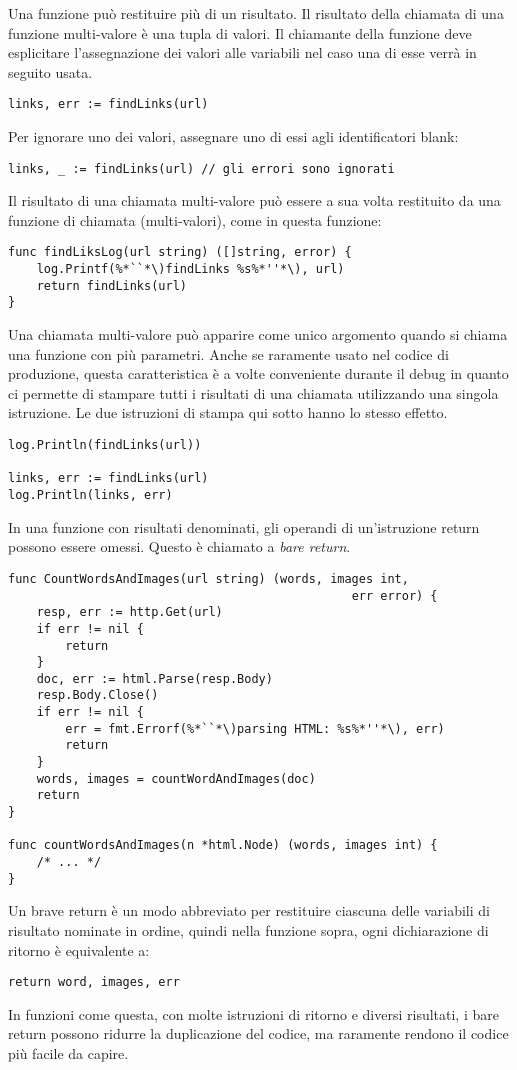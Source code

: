 Una funzione può restituire più di un risultato.
Il risultato della chiamata di una funzione multi-valore è una tupla di valori.
Il chiamante della funzione deve esplicitare l'assegnazione dei valori alle variabili nel caso una di esse verrà in seguito usata.
\begin{lstlisting}[frame=single, label={lst:lstlisting4-3.1}]
links, err := findLinks(url)
\end{lstlisting}
Per ignorare uno dei valori, assegnare uno di essi agli identificatori blank:
\begin{lstlisting}[frame=single, label={lst:lstlisting4-3.2}]
links, _ := findLinks(url) // gli errori sono ignorati
\end{lstlisting}
Il risultato di una chiamata multi-valore può essere a sua volta restituito da una funzione di chiamata (multi-valori), come in questa funzione:
\begin{lstlisting}[frame=single, label={lst:lstlisting4-3.3}]
func findLiksLog(url string) ([]string, error) {
    log.Printf(%*``*\)findLinks %s%*''*\), url)
    return findLinks(url)
}
\end{lstlisting}
Una chiamata multi-valore può apparire come unico argomento quando si chiama una funzione con più parametri.
Anche se raramente usato nel codice di produzione, questa caratteristica è a volte conveniente durante il debug in quanto ci permette di stampare tutti i risultati di una chiamata utilizzando una singola istruzione.
Le due istruzioni di stampa qui sotto hanno lo stesso effetto.
\begin{lstlisting}[frame=single, label={lst:lstlisting4-3.4}]
log.Println(findLinks(url))

links, err := findLinks(url)
log.Println(links, err)
\end{lstlisting}
In una funzione con risultati denominati, gli operandi di un'istruzione return possono essere omessi.
Questo è chiamato a \textit{bare return}.
\begin{lstlisting}[frame=single, label={lst:lstlisting4-3.5}]
func CountWordsAndImages(url string) (words, images int,
                                                err error) {
    resp, err := http.Get(url)
    if err != nil {
        return
    }
    doc, err := html.Parse(resp.Body)
    resp.Body.Close()
    if err != nil {
        err = fmt.Errorf(%*``*\)parsing HTML: %s%*''*\), err)
        return
    }
    words, images = countWordAndImages(doc)
    return
}

func countWordsAndImages(n *html.Node) (words, images int) {
    /* ... */
}
\end{lstlisting}
Un brave return è un modo abbreviato per restituire ciascuna delle variabili di risultato nominate in ordine, quindi nella funzione sopra, ogni dichiarazione di ritorno è equivalente a:
\begin{lstlisting}[frame=single, label={lst:lstlisting4-3.6}]
return word, images, err
\end{lstlisting}
In funzioni come questa, con molte istruzioni di ritorno e diversi risultati, i bare return possono ridurre la duplicazione del codice, ma raramente rendono il codice più facile da capire.